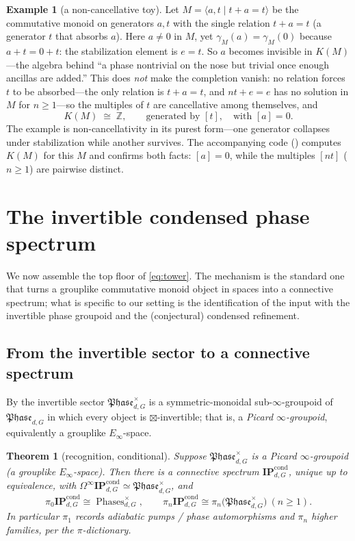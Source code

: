 \documentclass[12pt]{article}
\newcommand{\Phase}{\mathfrak{Phase}}          %
\newcommand{\Phases}{\operatorname{Phases}}    %
\newcommand{\IPcond}{\mathbf{IP}^{\mathrm{cond}}}  %
\newcommand{\Groth}{K}                       %
\newcommand{\Zp}{\mathbb{Z}}
\newcommand{\inv}[1]{\Phase_{#1}^{\times}}   %
\newtheorem{theorem}{Theorem}[section]
\theoremstyle{definition}
\newtheorem{example}[example]{Example}
\theoremstyle{remark}
\theoremstyle{plain}
\begin{document}
\begin{example}[a non-cancellative toy]
\label{ex:noncanc}
Let $M=\langle a,t\mid t+a=t\rangle$ be the commutative monoid on generators
$a,t$ with the single relation $t+a=t$ (a generator $t$ that absorbs $a$). Here
$a\ne 0$ in $M$, yet $\gamma_M(a)=\gamma_M(0)$ because $a+t=0+t$: the
stabilization element is $e=t$. So $a$ becomes invisible in $\Groth(M)$---the
algebra behind ``a phase nontrivial on the nose but trivial once enough ancillas
are added.'' This does \emph{not} make the completion vanish: no relation forces
$t$ to be absorbed---the only relation is $t+a=t$, and $nt+e=e$ has no solution
in $M$ for $n\ge1$---so the multiples of $t$ are cancellative among themselves,
and
\[
  \Groth(M)\;\cong\;\Zp,\qquad\text{generated by }[t],\quad\text{with }[a]=0 .
\]
The example is non-cancellativity in its purest form---one generator collapses
under stabilization while another survives. The accompanying code
() computes $\Groth(M)$ for this $M$ and confirms both facts:
$[a]=0$, while the multiples $[nt]$ ($n\ge1$) are pairwise distinct.
\end{example}

\section{The invertible condensed phase spectrum}
\label{sec:spectrum}

We now assemble the top floor of \eqref{eq:tower}. The mechanism is the standard
one that turns a grouplike commutative monoid object in spaces into a connective
spectrum; what is specific to our setting is the identification of the input with
the invertible phase groupoid and the (conjectural) condensed refinement.

\subsection{From the invertible sector to a connective spectrum}

By  the invertible sector $\inv{d,G}$ is a symmetric-monoidal
sub-$\infty$-groupoid of $\Phase_{d,G}$ in which every object is
$\boxtimes$-invertible; that is, a \emph{Picard $\infty$-groupoid}, equivalently
a grouplike $E_\infty$-space.

\begin{theorem}[recognition, conditional]
\label{thm:recognition}
Suppose $\inv{d,G}$ is a Picard $\infty$-groupoid (a grouplike $E_\infty$-space).
Then there is a connective spectrum $\IPcond_{d,G}$, unique up to equivalence,
with $\Omega^\infty\IPcond_{d,G}\simeq\inv{d,G}$, and
\[
  \pi_0\IPcond_{d,G}\cong\Phases_{d,G}^{\times},\qquad
  \pi_n\IPcond_{d,G}\cong\pi_n\bigl(\inv{d,G}\bigr)\ (n\ge 1).
\]
In particular $\pi_1$ records adiabatic pumps / phase automorphisms and $\pi_n$
higher families, per the $\pi$-dictionary.
\end{theorem}
\end{document}
